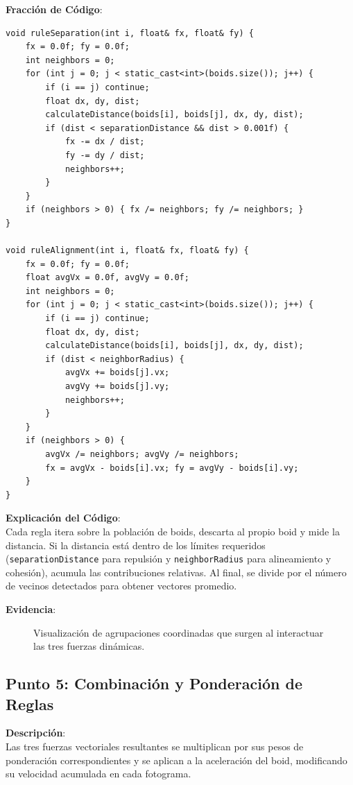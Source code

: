 \documentclass[11pt,a4paper]{article}
\begin{document}
\textbf{Fracción de Código}:
\begin{lstlisting}[caption={Cálculo de las fuerzas físicas en simulacion.cpp}, label={lst:reynolds_rules}]
void ruleSeparation(int i, float& fx, float& fy) {
    fx = 0.0f; fy = 0.0f;
    int neighbors = 0;
    for (int j = 0; j < static_cast<int>(boids.size()); j++) {
        if (i == j) continue;
        float dx, dy, dist;
        calculateDistance(boids[i], boids[j], dx, dy, dist);
        if (dist < separationDistance && dist > 0.001f) {
            fx -= dx / dist;
            fy -= dy / dist;
            neighbors++;
        }
    }
    if (neighbors > 0) { fx /= neighbors; fy /= neighbors; }
}

void ruleAlignment(int i, float& fx, float& fy) {
    fx = 0.0f; fy = 0.0f;
    float avgVx = 0.0f, avgVy = 0.0f;
    int neighbors = 0;
    for (int j = 0; j < static_cast<int>(boids.size()); j++) {
        if (i == j) continue;
        float dx, dy, dist;
        calculateDistance(boids[i], boids[j], dx, dy, dist);
        if (dist < neighborRadius) {
            avgVx += boids[j].vx;
            avgVy += boids[j].vy;
            neighbors++;
        }
    }
    if (neighbors > 0) {
        avgVx /= neighbors; avgVy /= neighbors;
        fx = avgVx - boids[i].vx; fy = avgVy - boids[i].vy;
    }
}
\end{lstlisting}

\textbf{Explicación del Código}: \\
Cada regla itera sobre la población de boids, descarta al propio boid y mide la distancia. Si la distancia está dentro de los límites requeridos (\lstinline{separationDistance} para repulsión y \lstinline{neighborRadius} para alineamiento y cohesión), acumula las contribuciones relativas. Al final, se divide por el número de vecinos detectados para obtener vectores promedio.

\textbf{Evidencia}:
\begin{figure}[htbp]
    \centering
    \caption{Visualización de agrupaciones coordinadas que surgen al interactuar las tres fuerzas dinámicas.}
    \label{fig:evidencia_punto4}
\end{figure}

\newpage

\subsection{Punto 5: Combinación y Ponderación de Reglas}
\textbf{Descripción}: \\
Las tres fuerzas vectoriales resultantes se multiplican por sus pesos de ponderación correspondientes y se aplican a la aceleración del boid, modificando su velocidad acumulada en cada fotograma.
\end{document}

